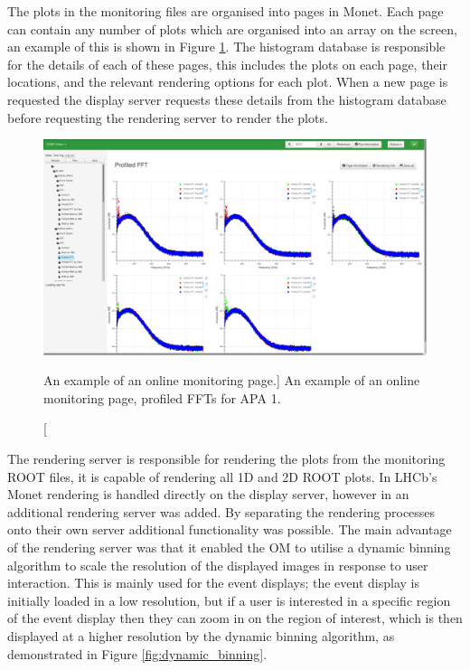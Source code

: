 The plots in the monitoring files are organised into pages in Monet. Each page
can contain any number of plots which are organised into an array on the screen,
an example of this is shown in Figure \ref{fig:monet_page}. The histogram 
database is responsible for the details of each of these pages, this includes
the plots on each page, their locations, and the relevant rendering options for
each plot. When a new page is requested the display server requests these
details from the histogram database before requesting the rendering server to 
render the plots.

\begin{figure}

	\centering

	\includegraphics[width=\textwidth]{figures/profiled_fft_monet.png}

	\caption
	[An example of an online monitoring page.] 
	{ An example of an online monitoring page, profiled FFTs for APA 1. } 
	\label{fig:monet_page}

\end{figure}

The rendering server is responsible for rendering the plots from the monitoring
ROOT files, it is capable of rendering all 1D and 2D ROOT plots. In LHCb's Monet
rendering is handled directly on the display server, however in \protodune{} an
additional rendering server was added. By separating the rendering processes 
onto their own server additional functionality was possible. The main 
advantage of the rendering server was that it enabled the OM to utilise a 
dynamic binning algorithm to scale the resolution of the displayed images in 
response to user interaction. This is mainly used for the event displays; the 
event display is initially loaded in a low resolution, but if a user is 
interested in a specific region of the event display then they can zoom in on 
the region of interest, which is then displayed at a higher resolution by the 
dynamic binning algorithm, as demonstrated in Figure \ref{fig:dynamic_binning}.

